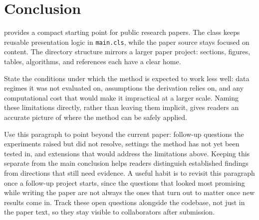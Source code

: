 \section{Conclusion}

\method provides a compact starting point for public research papers. The class
keeps reusable presentation logic in \texttt{main.cls}, while the paper
source stays focused on content. The directory structure mirrors a larger paper
project: sections, figures, tables, algorithms, and references each have a clear
home.

State the conditions under which the method is expected to work less well:
data regimes it was not evaluated on, assumptions the derivation relies on,
and any computational cost that would make it impractical at a larger scale.
Naming these limitations directly, rather than leaving them implicit, gives
readers an accurate picture of where the method can be safely applied.

Use this paragraph to point beyond the current paper: follow-up questions the
experiments raised but did not resolve, settings the method has not yet been
tested in, and extensions that would address the limitations above. Keeping
this separate from the main conclusion helps readers distinguish established
findings from directions that still need evidence. A useful habit is to
revisit this paragraph once a follow-up project starts, since the questions
that looked most promising while writing the paper are not always the ones
that turn out to matter once new results come in. Track these open questions
alongside the codebase, not just in the paper text, so they stay visible to
collaborators after submission.

